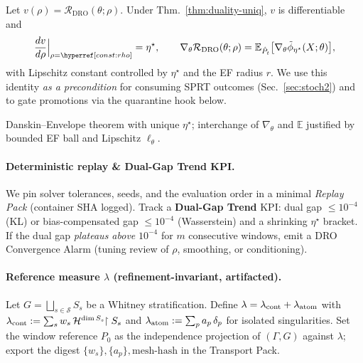 \begin{theorem}\label{thm:rho-sense}
\emph{}
Let $v(\rho)=\mathcal R_{\mathrm{DRO}}(\theta;\rho)$. Under Thm.~\ref{thm:duality-uniq}, $v$ is differentiable and
\[
\frac{dv}{d\rho}\Big|_{\rho=\constref{rho}}=\eta^\star,
\qquad
\nabla_\theta \mathcal R_{\mathrm{DRO}}(\theta;\rho) = \mathbb E_{\hat P_t}\big[\nabla_\theta \tilde\phi_{\eta^\star}(X;\theta)\big],
\]
with Lipschitz constant controlled by $\eta^\star$ and the EF radius $r$.
We use this identity \emph{as a precondition} for consuming SPRT outcomes (Sec.~\ref{sec:stoch2}) and to gate promotions via the quarantine hook below.
\begin{proofsketch}
Danskin–Envelope theorem with unique $\eta^\star$; interchange of $\nabla_\theta$ and $\mathbb E$ justified by bounded EF ball and Lipschitz $\ell_\theta$.
\end{proofsketch}
\end{theorem}

\paragraph{Deterministic replay \& Dual-Gap Trend KPI.}
We pin solver tolerances, seeds, and the evaluation order in a minimal \emph{Replay Pack} (container SHA logged).
Track a \textbf{Dual-Gap Trend} KPI: dual gap $\le 10^{-4}$ (KL) or bias-compensated gap $\le 10^{-4}$ (Wasserstein) and a shrinking $\eta^\star$ bracket. If the dual gap \emph{plateaus above} $10^{-4}$ for $m$ consecutive windows, emit a \textsf{DRO Convergence Alarm} (tuning review of $\rho$, smoothing, or conditioning).

\paragraph{Reference measure $\lambda$ (refinement-invariant, artifacted).}
\begin{definition}\label{def:ref2}
\emph{}
Let $G=\bigsqcup_{s\in\mathcal S} S_s$ be a Whitney stratification.
Define $\lambda=\lambda_{{\mathrm{cont}}}+\lambda_{{\mathrm{atom}}}$ with
$\lambda_{{\mathrm{cont}}} := \sum_{s} w_s\,\mathcal H^{\dim S_s}\!\!\restriction S_s$ and
$\lambda_{{\mathrm{atom}}}:=\sum_{p} a_p\,\delta_p$ for isolated singularities.
Set the window reference $P_0$ as the independence projection of $(\Gamma,G)$ against $\lambda$; export the digest $\{w_s\},\{a_p\},\text{mesh-hash}$ in the Transport Pack.
\end{definition}

